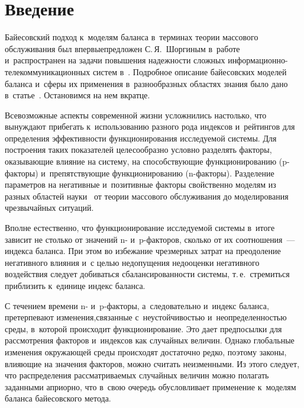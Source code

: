 
\thispagestyle{headings}

\begin{multicols}{2}

\label{st\stat}

\section{ Введение}

Байесовский подход к~моделям баланса в~терминах теории массового обслуживания 
был впервые\linebreak предложен С.\,Я.~Шоргиным в~работе~\cite{Shorgin05} и~рас\-про\-стра\-нен 
на задачи повышения на\-деж\-ности \mbox{сложных} 
ин\-фор\-ма\-ци\-он\-но-те\-ле\-ком\-му\-ни\-ка\-ци\-он\-ных
сис\-тем  в~\cite{KuSoSh}.
Подробное описание байесовских моделей баланса и~сферы их применения 
в~разнообразных областях знания было дано в~статье~\cite{Ku2018}. Остановимся на 
нем вкратце.

Всевозможные аспекты современной жизни усложнились настолько, что вынуждают 
прибегать к~использованию разного рода индексов и~рейтингов для определения 
эффективности функционирования исследуемой системы. Для построения таких 
показателей целесообразно условно разделять факторы, оказывающие влияние на 
систему, на способствующие функционированию ({p-фак\-то\-ры}) и~препятствующие 
функционированию ({n-фак\-то\-ры}).
Разделение параметров на негативные и~позитивные факторы свойственно моделям из 
разных областей науки~\cite{Ku2018} от теории массового обслуживания до 
моделирования чрезвычайных ситуаций.

Вполне естественно, что функционирование исследуемой системы в~итоге зависит не 
столько от значений n- и~p-фак\-то\-ров, сколько от их соотношения~--- индекса 
баланса. При этом во избежание чрезмерных затрат на преодоление негативного 
влияния и~с целью недопущения недооценки негативного воздействия следует 
добиваться сбалансированности системы, т.\,е.\ стремиться приблизить к~единице 
индекс баланса.

С течением времени n- и~p-фак\-то\-ры, а~следова\-тельно и~индекс баланса, 
претерпевают изменения,\linebreak связанные с~неустойчивостью и~не\-опре\-де\-лен\-ностью среды, 
в~которой происходит функционирование. Это дает предпосылки для рассмотрения 
факторов и~индексов как случайных величин. Однако глобальные изменения 
окружающей среды происходят достаточно редко, поэтому законы, влияющие на 
значения факторов, можно считать неизменными. Из этого следует, что 
распределения рассматриваемых случайных величин можно полагать заданными 
априорно, что в~свою очередь обусловливает применение к~моделям баланса 
байесовского метода.


\end{multicols}
